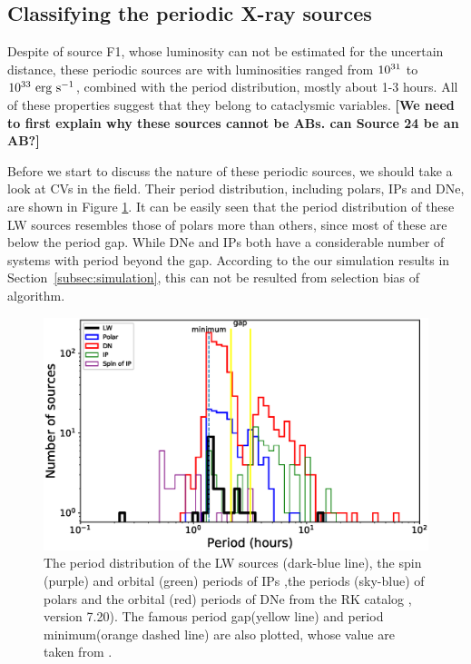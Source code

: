 \documentclass[fleqn,usenatbib]{mnras}
\begin{document}
\subsection{Classifying the periodic X-ray sources}
\label{subsec:class}
Despite of source F1, whose luminosity can not be estimated for the uncertain distance, 
these periodic sources are with luminosities ranged from $\rm 10^{31}$ to $\rm 10^{33}~erg~s^{-1}$, combined with the period distribution, mostly about 1-3 hours. All of these properties suggest that they belong to cataclysmic variables. {\bf [We need to first explain why these sources cannot be ABs. can Source 24 be an AB?]}

Before we start to discuss the nature of these periodic sources, we should take a look at CVs in the field. Their period distribution, including polars, IPs and DNe, are shown in Figure \ref{fig:N_P}.
It can be easily seen that the period distribution of these LW sources resembles those of polars more than others, since most of these are below the period gap. While DNe and IPs both have a considerable number of systems with period beyond the gap. According to the our simulation results in Section~\ref{subsec:simulation}, this can not be resulted from selection bias of algorithm. 

\begin{figure}
\centering
\includegraphics[scale=0.73]{./figure/CV/N_P.eps}
\caption{The period distribution of the LW sources (dark-blue line), the spin (purple) and orbital (green) periods of IPs ,the periods (sky-blue) of polars and the orbital (red) periods of DNe from the RK catalog \citep{2003A&A...404..301R}, version 7.20). The famous period gap(yellow line) and period minimum(orange dashed line) are also plotted, whose value are taken from \citep{2011ApJS..194...28K}.\label{fig:N_P}}
\end{figure}
\end{document}
